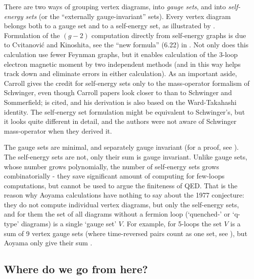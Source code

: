 There are two ways of grouping vertex diagrams, into \emph{gauge sets},
and into \emph{self-energy sets} (or the ``externally gauge-invariant''
sets). Every vertex diagram belongs both to a gauge set and to a
self-energy set, as illustrated by .
Formulation of the $(g-2)$ computation directly from self-energy graphs
is due to
{Cvitanovi\'{c} and Kinoshita}, see the ``new formula'' (6.22) in
. Not only does this calculation use fewer Feynman
graphs, but it enables calculation of the 3-loop electron magnetic moment
by two independent methods (and in this way helps track down and
eliminate errors in either calculation). As an important aside,
Carroll gives the credit for self-energy sets
only to the mass-operator formalism of Schwinger, even though Carroll papers
look closer to  than to Schwinger and Sommerfield;
 is cited, and his derivation is also based on the
Ward-Takahashi identity. The self-energy set
formulation might be equivalent to Schwinger's, but it looks quite
different in detail, and the authors were not aware of Schwinger
mass-operator when they derived it.

The gauge sets are minimal, and separately gauge invariant (for a proof,
see ). The self-energy sets are not, only their sum is
gauge invariant.
Unlike gauge sets, whose number grows polynomially, the number of
self-energy sets grows combinatorially - they save significant amount
of computing for few-loops computations, but cannot be used to argue the
finiteness of QED.
That is the reason why Aoyama \etal{}
calculations have nothing to say about the 1977 conjecture:
they do not compute individual vertex diagrams, but only the self-energy
sets, and for them the set of all diagrams without a fermion loop
(`quenched-' or `q-type' diagrams) is a single `gauge set'
$V$. For example, for 5-loops the set $V$ is a sum of 9 vertex gauge sets
(where time-reversed pairs count as one set, see ),
but Aoyama \etal{} only give their sum .

\subsection{Where do we go from here?}
\label{sect:future}

